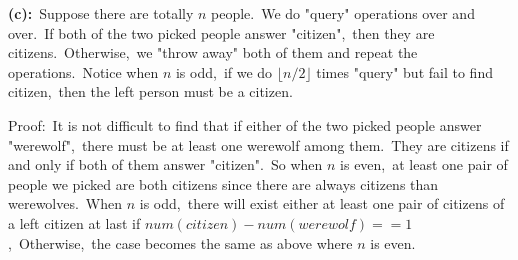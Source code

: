 \documentclass[]{article}
\begin{document}
	\textbf{(c):}\ Suppose there are totally $n$ people.\ We do "query" operations over and over.\ If both of the two picked people answer "citizen",\ then they are citizens.\ Otherwise,\ we "throw away" both of them and repeat the operations.\ Notice when $n$ is odd,\ if we do $\lfloor n/2\rfloor$ times "query" but fail to find citizen,\ then the left person must be a citizen.
	
	Proof:\ It is not difficult to find that if either of the two picked people answer "werewolf",\ there must be at least one werewolf among them.\ They are citizens if and only if both of them answer "citizen".\ So when $n$ is even,\ at least one pair of people we picked are both citizens since there are always citizens than werewolves.\ When $n$ is odd,\ there will exist either at least one pair of citizens of a left citizen at last if $num(citizen)-num(werewolf) == 1$,\ Otherwise,\ the case becomes the same as above where $n$ is even. 	   
\end{document}
